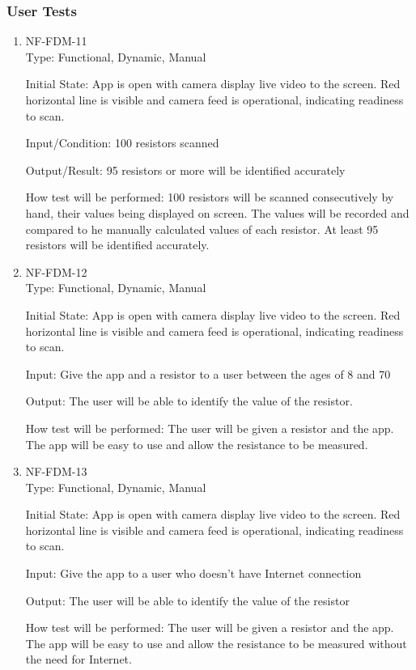 \documentclass[12pt, titlepage]{article}
\begin{document}
\subsubsection{User Tests}
\begin{enumerate}
\item{NF-FDM-11\\}
Type: Functional, Dynamic, Manual
					
Initial State: 
App is open with camera display live video to the screen. Red horizontal line is visible and camera feed is operational, indicating readiness to scan.
					
Input/Condition: 
100 resistors scanned
					
Output/Result: 
95 resistors or more will be identified accurately
					
How test will be performed: 
100 resistors will be scanned consecutively by hand, their values being displayed on screen. The values will be recorded and compared to he manually calculated values of each resistor. At least 95 resistors will be identified accurately.
					
\item{NF-FDM-12\\}
Type: Functional, Dynamic, Manual
					
Initial State: 
App is open with camera display live video to the screen. Red horizontal line is visible and camera feed is operational, indicating readiness to scan.
					
Input: 
Give the app and a resistor to a user between the ages of 8 and 70
					
Output: 
The user will be able to identify the value of the resistor.
					
How test will be performed: 
The user will be given a resistor and the app. The app will be easy to use and allow the resistance to be measured.

\item{NF-FDM-13\\}
Type: Functional, Dynamic, Manual
					
Initial State: 
App is open with camera display live video to the screen. Red horizontal line is visible and camera feed is operational, indicating readiness to scan.
					
Input: 
Give the app to a user who doesn't have Internet connection
					
Output: 
The user will be able to identify the value of the resistor
					
How test will be performed: 
The user will be given a resistor and the app. The app will be easy to use and allow the resistance to be measured without the need for Internet.

\end{enumerate}
\end{document}
